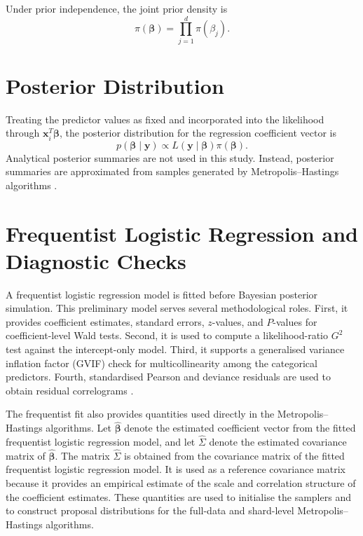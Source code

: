 Under prior independence, the joint prior density is
\[
\pi(\boldsymbol{\beta})
=
\prod_{j=1}^{d}
\pi(\beta_j).
\]

\section{Posterior Distribution}

Treating the predictor values as fixed and incorporated into the likelihood through $\mathbf{x}_i^T\boldsymbol{\beta}$, the posterior distribution for the regression coefficient vector is
\[
p(\boldsymbol{\beta}\mid \mathbf{y})
\propto
L(\mathbf{y}\mid \boldsymbol{\beta})\pi(\boldsymbol{\beta}).
\]
Analytical posterior summaries are not used in this study. Instead, posterior summaries are approximated from samples generated by Metropolis--Hastings algorithms \cite{gelman2013bayesian,tierney1994markov}.

\section{Frequentist Logistic Regression and Diagnostic Checks}

A frequentist logistic regression model is fitted before Bayesian posterior simulation. This preliminary model serves several methodological roles. First, it provides coefficient estimates, standard errors, $z$-values, and $P$-values for coefficient-level Wald tests. Second, it is used to compute a likelihood-ratio $G^2$ test against the intercept-only model. Third, it supports a generalised variance inflation factor (GVIF) check for multicollinearity among the categorical predictors. Fourth, standardised Pearson and deviance residuals are used to obtain residual correlograms \cite{mccullagh1989generalized,hosmer2013applied}.

The frequentist fit also provides quantities used directly in the Metropolis--Hastings algorithms. Let $\widehat{\boldsymbol{\beta}}$ denote the estimated coefficient vector from the fitted frequentist logistic regression model, and let $\widehat{\Sigma}$ denote the estimated covariance matrix of $\widehat{\boldsymbol{\beta}}$. The matrix $\widehat{\Sigma}$ is obtained from the covariance matrix of the fitted frequentist logistic regression model. It is used as a reference covariance matrix because it provides an empirical estimate of the scale and correlation structure of the coefficient estimates. These quantities are used to initialise the samplers and to construct proposal distributions for the full-data and shard-level Metropolis--Hastings algorithms.


